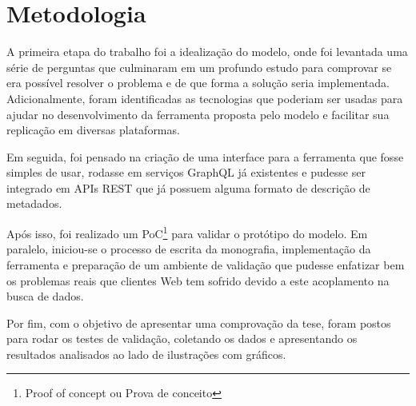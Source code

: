 \section[Metodologia]{Metodologia}

A primeira etapa do trabalho foi a idealização do modelo, onde foi levantada uma série de perguntas que culminaram em um profundo estudo para comprovar se era possível resolver o problema e de que forma a solução seria implementada. Adicionalmente, foram identificadas as tecnologias que poderiam ser usadas para ajudar no desenvolvimento da ferramenta proposta pelo modelo e facilitar sua replicação em diversas plataformas.

Em seguida, foi pensado na criação de uma interface para a ferramenta que fosse simples de usar, rodasse em serviços GraphQL já existentes e pudesse ser integrado em APIs REST que já possuem alguma formato de descrição de metadados.

Após isso, foi realizado um PoC\footnote{
  Proof of concept ou Prova de conceito
} para validar o protótipo do modelo. Em paralelo, iniciou-se o processo de escrita da monografia, implementação da ferramenta e preparação de um ambiente de validação que pudesse enfatizar bem os problemas reais que clientes Web tem sofrido devido a este acoplamento na busca de dados. 

Por fim, com o objetivo de apresentar uma comprovação da tese, foram postos para rodar os testes de validação, coletando os dados e apresentando os resultados analisados ao lado de ilustrações com gráficos.